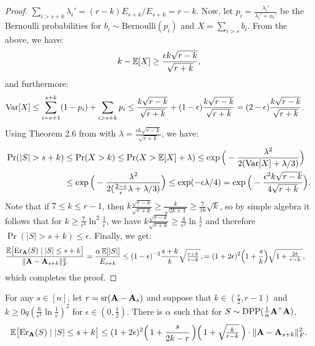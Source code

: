 \documentclass{article}
\begin{document}
\begin{proof}
    $\sum_{i>s+ k}\lambda_i'=(r-k)E_{s+k}/E_{s+k}=r-k$.
      Now, let $p_i=\frac{\lambda_i'}{\lambda_i'+\alpha_i'}$ be the
      Bernoulli probabilities for
  $b_i\sim\mathrm{Bernoulli}(p_i)$
  and $X =\sum_{i>s} b_i$. From the above, we have:
  \begin{align*}
k - \mathbb E[X] \geq \frac{\epsilon k\sqrt{r-k}}{\sqrt{r+k}},
  \end{align*}
  and furthermore:
  \begin{align*}
    \mathrm{Var}[X]&\leq \sum_{i=s+1}^{s+k}(1-p_i) + \sum_{i>s+k}p_i
    \leq \frac{k\sqrt{r-k}}{\sqrt{r+k}}+
      (1-\epsilon)\frac{k\sqrt{r-k}}{\sqrt{r+k}} = (2-\epsilon) \frac{k\sqrt{r-k}}{\sqrt{r+k}} .
  \end{align*}
  Using
  Theorem 2.6 from \cite{ChungLu2006book} with $\lambda=\frac{\epsilon
    k\sqrt{r-k}}{\sqrt{r+k}}$, we have:
  \begin{align*}
    \Pr(|S|>s+k)&\leq \Pr(X>k)\leq \Pr(X > \E[X]+\lambda)
    \leq \exp\Big(-\frac{\lambda^2}{2(\Var[X]+\lambda/3)}\Big)\\
    &\leq \exp\Big(-\frac{\lambda^2}{2(\frac{2-\epsilon}\epsilon
      \lambda+\lambda/3)}\Big)\leq\exp(-\epsilon\lambda /4)
      =\exp\Big(-\frac{\epsilon^2k\sqrt{r-k}}{4\sqrt{r+k}}\Big). 
  \end{align*}
  Note that if $7\leq k\leq r-1$, then $k\frac{\sqrt{r-k}}{\sqrt{r+k}}\geq
\frac{k}{\sqrt{2k+1}}\geq \frac{7}{16}\sqrt k$, so by simple algebra
it follows that for $k\geq \frac 7{\epsilon^4}\ln^2\frac1\epsilon$,
we have $k\frac{\sqrt{r-k}}{\sqrt{r+k}}\geq
\frac4{\epsilon^2}\ln\frac1\epsilon$ and therefore
$\Pr(|S|>s+k)\leq \epsilon$. Finally, we get:
    \begin{align*}
      \frac{\mathbb E\big[\mathrm{Er}_\mathbf A(S)\mid |S|\leq s+k\big]}{\|\mathbf A-\mathbf A_{s+k}\|_F^2}
      &=
        \frac{\alpha\,\mathbb E[|S|]}{E_{s+k}}
        \leq(1-\epsilon)^{-2}\frac{s+k}{k}\sqrt{\tfrac{r+k}{r-k}\,},
        =(1+2\epsilon)^2\Big(1+\frac sk\Big)\sqrt{1 + \tfrac {2k}{r-k}\,},        
    \end{align*}
    which completes the proof.
\end{proof}

  
  \begin{theorem}
For any $s\in[n]$, let $r={\mathrm{sr}}(\mathbf A-\mathbf A_s)$ and suppose that $k\in(\frac
r2,r-1)$ and $k\ge0q (\frac6{\epsilon^2}\ln\frac1\epsilon)^2$ for
$\epsilon\in(0,\frac12)$. There is $\alpha$ such that for 
    $S\sim\DPP(\frac1\alpha\A^\top\A)$,
    \begin{align*}
\mathbb E\big[\mathrm{Er}_\mathbf A(S)\mid |S|\leq s+k\big] \leq
(1+2\epsilon)^2\Big(\,1+\frac{s}{2k-r}\,\Big)\Big(\,1 +  \sqrt{\!\tfrac {k}{r-k}}\,\Big)\cdot\|\mathbf A-\mathbf A_{s+k}\|_F^2.
    \end{align*}
  \end{theorem}
\end{document}
